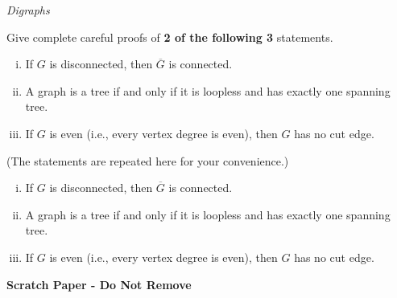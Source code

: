 \documentclass[addpoints,10pt]{exam}
\newcounter{savedqn}
\begin{document}
\begin{questions}
\setcounter{question}{\thesavedqn}
\question[20] \textit{Digraphs}

\newpage

\question[40]
Give complete careful proofs of \textbf{2 of the following 3} statements.  
\begin{enumerate}[(i)]
\item If $G$ is disconnected, then $\overline{G}$ is connected.
\item 
A graph is a tree if and only if it is loopless and has exactly one spanning tree.
\item 
If $G$ is even (i.e., every vertex degree is even), then $G$ has no cut edge.
\end{enumerate}

\newpage

(The statements are repeated here for your convenience.)
\begin{enumerate}[(i)]
\item If $G$ is disconnected, then $\overline{G}$ is connected.
\item A graph is a tree if and only if it is loopless and has exactly one spanning tree.
\item If $G$ is even (i.e., every vertex degree is even), then $G$ has no cut edge.
\end{enumerate}





\newpage
\textbf{Scratch Paper - Do Not Remove}



\end{questions}
\end{document}
